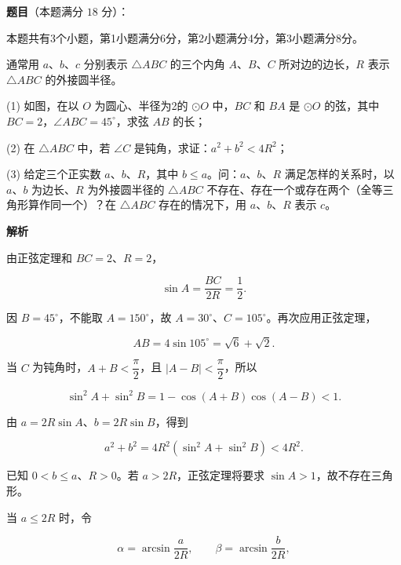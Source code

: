 \begin{answer}

\textbf{题目}（本题满分 $18$ 分）：

本题共有3个小题，第1小题满分6分，第2小题满分4分，第3小题满分8分。

通常用 $a$、$b$、$c$ 分别表示 $\triangle ABC$ 的三个内角 $A$、$B$、$C$ 所对边的边长，$R$ 表示 $\triangle ABC$ 的外接圆半径。

(1) 如图，在以 $O$ 为圆心、半径为2的 $\odot O$ 中，$BC$ 和 $BA$ 是 $\odot O$ 的弦，其中 $BC=2$，$\angle ABC=45^\circ$，求弦 $AB$ 的长；

(2) 在 $\triangle ABC$ 中，若 $\angle C$ 是钝角，求证：$a^2+b^2<4R^2$；

(3) 给定三个正实数 $a$、$b$、$R$，其中 $b\leq a$。问：$a$、$b$、$R$ 满足怎样的关系时，以 $a$、$b$ 为边长、$R$ 为外接圆半径的 $\triangle ABC$ 不存在、存在一个或存在两个（全等三角形算作同一个）？在 $\triangle ABC$ 存在的情况下，用 $a$、$b$、$R$ 表示 $c$。
\nopagebreak[4]
\begin{center}\end{center}
\nopagebreak[4]
\textbf{解析}


由正弦定理和 $BC=2$、$R=2$，

\nopagebreak[4]
\[
\sin A=\frac{BC}{2R}=\frac12.
\]

因 $B=45^\circ$，不能取 $A=150^\circ$，故 $A=30^\circ$、$C=105^\circ$。再次应用正弦定理，

\nopagebreak[4]
\[
AB=4\sin105^\circ=\sqrt6+\sqrt2.
\]


当 $C$ 为钝角时，$A+B<\dfrac\pi2$，且 $|A-B|<\dfrac\pi2$，所以

\nopagebreak[4]
\[
\sin^2A+\sin^2B
=1-\cos(A+B)\cos(A-B)<1.
\]

由 $a=2R\sin A$、$b=2R\sin B$，得到

\nopagebreak[4]
\[
a^2+b^2=4R^2(\sin^2A+\sin^2B)<4R^2.
\]


已知 $0<b\le a$、$R>0$。若 $a>2R$，正弦定理将要求 $\sin A>1$，故不存在三角形。

当 $a\le2R$ 时，令

\nopagebreak[4]
\[
\alpha=\arcsin\frac{a}{2R},\qquad
\beta=\arcsin\frac{b}{2R},
\]


\end{answer}
